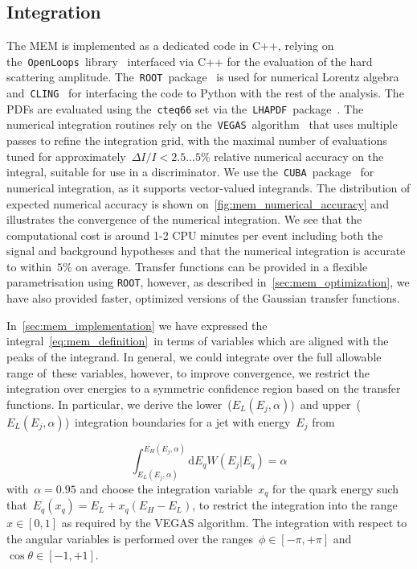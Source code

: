 \subsection{Integration}
\label{sec:mem_integration}

The MEM is implemented as a dedicated code in C++, relying on the~\texttt{OpenLoops}~library~\cite{Cascioli:2011va} interfaced via C++ for the evaluation of the hard scattering amplitude. The~\texttt{ROOT}~package~\cite{Brun:1997pa} is used for numerical Lorentz algebra and~\texttt{CLING}~\cite{Vasilev:2012ev} for interfacing the code to Python with the rest of the analysis. The PDFs are evaluated using the~\texttt{cteq66} set via the~\texttt{LHAPDF}~package~\cite{Buckley:2014ana}. The numerical integration routines rely on the~\texttt{VEGAS}~algorithm~\cite{Lepage:1977sw} that uses multiple passes to refine the integration grid, with the maximal number of evaluations tuned for approximately~$\Delta I / I < 2.5 \dots 5\%$ relative numerical accuracy on the integral, suitable for use in a discriminator. We use the~\texttt{CUBA}~package~\cite{Hahn:2004fe} for numerical integration, as it supports vector-valued integrands. The distribution of expected numerical accuracy is shown on~\cref{fig:mem_numerical_accuracy} and illustrates the convergence of the numerical integration. We see that the computational cost is around 1-2 CPU minutes per event including both the signal and background hypotheses and that the numerical integration is accurate to within~$5\%$ on average. Transfer functions can be provided in a flexible parametrisation using \texttt{ROOT}, however, as described in~\cref{sec:mem_optimization}, we have also provided faster, optimized versions of the Gaussian transfer functions.

In~\cref{sec:mem_implementation} we have expressed the integral~\cref{eq:mem_definition}~in terms of variables which are aligned with the peaks of the integrand. In general, we could integrate over the full allowable range of these variables, however, to improve convergence, we restrict the integration over energies to a symmetric confidence region based on the transfer functions. In particular, we derive the lower~($E_L(E_j,\alpha)$)~and upper~($E_L(E_j,\alpha)$)~integration boundaries for a jet with energy~$E_j$ from

\begin{equation}
\int_{E_L(E_j,\alpha)}^{E_H(E_j,\alpha)} \mathrm{d}E_q W(E_j | E_q) = \alpha
\end{equation}
with~$\alpha = 0.95$ and choose the integration variable~$x_q$ for the quark energy such that~$E_q(x_q) = E_L + x_q (E_H - E_L)$, to restrict the integration into the range~$x\in[0,1]$ as required by the VEGAS algorithm. The integration with respect to the angular variables is performed over the ranges~$\phi \in [-\pi, +\pi]$ and~$\cos{\theta} \in [-1, +1]$.


